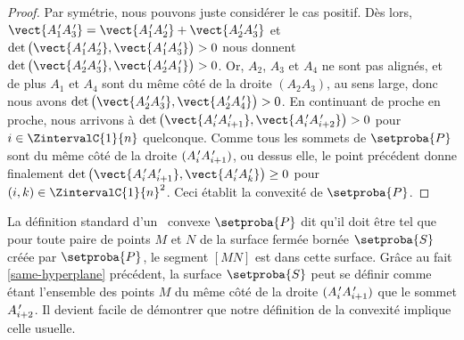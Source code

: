 \begin{proof}
    Par symétrie, nous pouvons juste considérer le cas positif.
	Dès lors,
	$\vect{\primeit{A}_1 \primeit{A}_3} = \vect{\primeit{A}_1 \primeit{A}_2} + \vect{\primeit{A}_2 \primeit{A}_3}$
	et
	$\det \big( \vect{\primeit{A}_1 \primeit{A}_2}, \vect{\primeit{A}_1 \primeit{A}_3} \big) > 0$
    nous donnent
	$\det \big( \vect{\primeit{A}_2 \primeit{A}_3}, \vect{\primeit{A}_2 \primeit{A}_1} \big) > 0$.
	Or, $A_2$, $A_3$ et $A_4$ ne sont pas alignés, et de plus $A_1$ et $A_4$ sont du même côté de la droite $(A_2 A_3)$, au sens large,
	donc nous avons
	$\det \big( \vect{\primeit{A}_2 \primeit{A}_3}, \vect{\primeit{A}_2 \primeit{A}_4} \big) > 0$.
	En continuant de proche en proche, nous arrivons à
	$\det \big( \vect{\primeit{A}_i \primeit{A}_{i+1}}, \vect{\primeit{A}_i \primeit{A}_{i+2}} \big) > 0$
	pour $i \in \ZintervalC{1}{n}$ quelconque.
	Comme tous les sommets de $\setproba{P}$ sont du même côté de la droite $( A^{\,\prime}_i A^{\,\prime}_{i+1} )$, ou dessus elle,
	le point précédent donne finalement
	$\det \big( \vect{\primeit{A}_i \primeit{A}_{i+1}}, \vect{\primeit{A}_i \primeit{A}_k} \big) \geq 0$
	pour $(i, k) \in \ZintervalC{1}{n}^2$.
	Ceci établit la convexité de $\setproba{P}$.
\end{proof}




\begin{remark}
    La définition standard d'un \ngone\ convexe $\setproba{P}$ dit qu'il doit être tel que pour toute paire de points $M$ et $N$ de la surface fermée bornée $\setproba{S}$ créée par $\setproba{P}$, le segment $[MN]$ est dans cette surface.
    Grâce au fait \ref{same-hyperplane} précédent, la surface $\setproba{S}$ peut se définir comme étant l'ensemble des points $M$ du même côté de la droite $( A^{\,\prime}_i A^{\,\prime}_{i+1} )$ que le sommet $A^{\,\prime}_{i+2}$.
    Il devient facile de démontrer que notre définition de la convexité implique celle usuelle. 
\end{remark}
